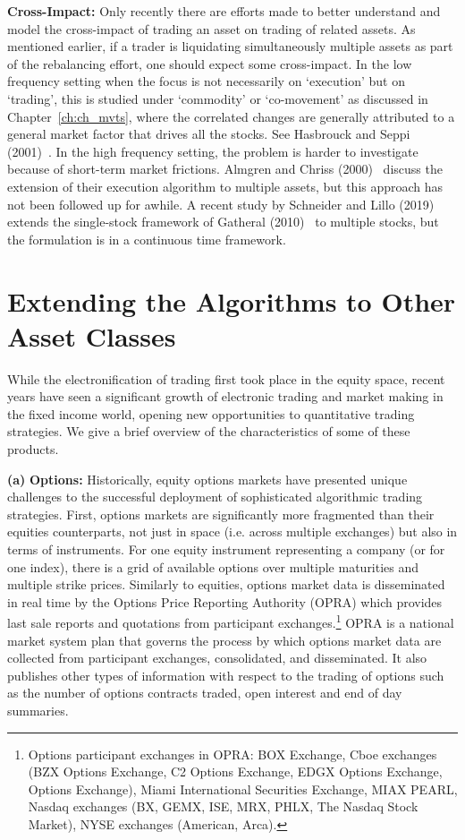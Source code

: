 \noindent\textbf{Cross-Impact:} Only recently there are efforts made to better understand and model the cross-impact of trading an asset on trading of related assets. As mentioned earlier, if a trader is liquidating simultaneously multiple assets as part of the rebalancing effort, one should expect some cross-impact. In the low frequency setting when the focus is not necessarily on `execution' but on `trading', this is studied under `commodity' or `co-movement' as discussed in Chapter~\ref{ch:ch_mvts}, where the correlated changes are generally attributed to a general market factor that drives all the stocks. See Hasbrouck and Seppi (2001)~\cite{seppi2001}. In the high frequency setting, the problem is harder to investigate because of short-term market frictions. Almgren and Chriss (2000)~\cite{alm2000} discuss the extension of their execution algorithm to multiple assets, but this approach has not been followed up for awhile. A recent study by Schneider and Lillo (2019)~\cite{schnlillo19} extends the single-stock framework of Gatheral (2010)~\cite{gatheral} to multiple stocks, but the formulation is in a continuous time framework. 



\section{Extending the Algorithms to Other Asset Classes}

While the electronification of trading first took place in the equity space, recent years have seen a significant growth of electronic trading and market making in the fixed income world, opening new opportunities to quantitative trading strategies. We give a brief overview of the characteristics of some of these products. \twomedskip


\noindent\textbf{(a)} \textbf{Options:} Historically, equity options markets have presented unique challenges to the successful deployment of sophisticated algorithmic trading strategies. First, options markets are significantly more fragmented than their equities counterparts, not just in space (i.e. across multiple exchanges) but also in terms of instruments. For one equity instrument representing a company (or for one index), there is a grid of available options over multiple maturities and multiple strike prices. Similarly to equities, options market data is disseminated in real time by the Options Price Reporting Authority (OPRA) which provides last sale reports and quotations from participant exchanges.\footnote{Options participant exchanges in OPRA: BOX Exchange, Cboe exchanges (BZX Options Exchange, C2 Options Exchange, EDGX Options Exchange, Options Exchange), Miami International Securities Exchange, MIAX PEARL, Nasdaq exchanges (BX, GEMX, ISE, MRX, PHLX, The Nasdaq Stock Market), NYSE exchanges (American, Arca).} OPRA is a national market system plan that governs the process by which options market data are collected from participant exchanges, consolidated, and disseminated. It also publishes other types of information with respect to the trading of options such as the number of options contracts traded, open interest and end of day summaries. 


